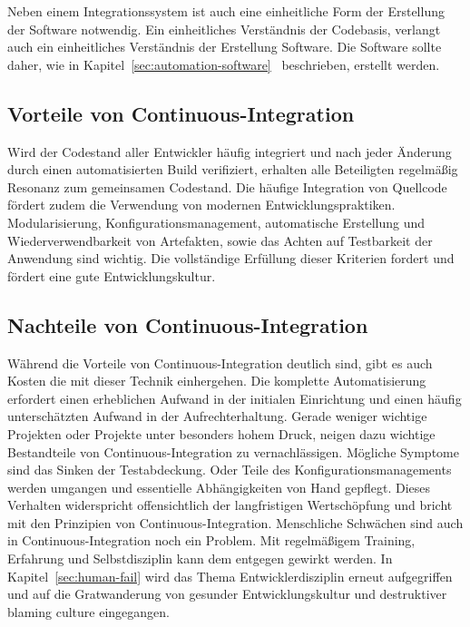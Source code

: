 Neben einem Integrationssystem ist auch eine einheitliche Form der Erstellung der Software notwendig. Ein einheitliches Verständnis der Codebasis, verlangt auch ein einheitliches Verständnis der Erstellung Software. Die Software sollte daher, wie in Kapitel~\ref{sec:automation-software}~ beschrieben, erstellt werden.


\subsection{Vorteile von Continuous-Integration}

Wird der Codestand aller Entwickler häufig integriert und nach jeder Änderung durch einen automatisierten Build verifiziert, erhalten alle Beteiligten regelmäßig Resonanz zum gemeinsamen Codestand.
Die häufige Integration von Quellcode fördert zudem die Verwendung von modernen Entwicklungspraktiken. Modularisierung, Konfigurationsmanagement, automatische Erstellung und Wiederverwendbarkeit von Artefakten, sowie das Achten auf Testbarkeit der Anwendung sind wichtig. Die vollständige Erfüllung dieser Kriterien fordert und fördert eine gute Entwicklungskultur.

\subsection{Nachteile von Continuous-Integration}

Während die Vorteile von Continuous-Integration deutlich sind, gibt es auch Kosten die mit dieser Technik einhergehen. 
Die komplette Automatisierung erfordert einen erheblichen Aufwand in der initialen Einrichtung und einen häufig 
unterschätzten Aufwand in der Aufrechterhaltung. Gerade weniger wichtige Projekten oder Projekte unter besonders hohem 
Druck, neigen dazu wichtige Bestandteile von Continuous-Integration zu vernachlässigen. Mögliche Symptome sind das Sinken 
der Testabdeckung. Oder Teile des Konfigurationsmanagements werden umgangen und essentielle Abhängigkeiten von Hand 
gepflegt. Dieses Verhalten widerspricht offensichtlich der langfristigen Wertschöpfung und bricht mit den Prinzipien von 
Continuous-Integration. Menschliche Schwächen sind auch in Continuous-Integration noch ein Problem. Mit regelmäßigem 
Training, Erfahrung und Selbstdisziplin kann dem entgegen gewirkt werden. In Kapitel~\ref{sec:human-fail} wird das Thema 
Entwicklerdisziplin erneut aufgegriffen und auf die Gratwanderung von gesunder Entwicklungskultur und destruktiver 
\glqq blaming culture\grqq{} eingegangen.

